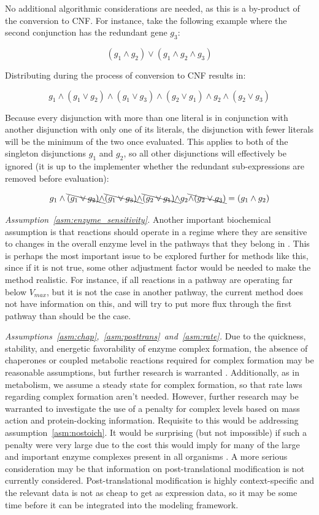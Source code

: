 No additional algorithmic considerations are needed, as this is a
by-product of the conversion to CNF. For instance, take the following
example where the second conjunction has the redundant gene $g_3$: 

\[(g_1 \land g_2) \lor (g_1 \land g_2 \land g_3)\]

Distributing during the process of conversion to CNF results in:

\[
g_1 \land (g_1 \lor g_2 ) \land (g_1 \lor g_3) \land (g_2 \lor g_1) 
\land g_2 \land (g_2 \lor g_3)
\]

Because every disjunction with more than one literal is in conjunction
with another disjunction with only one of its literals, the
disjunction with fewer literals will be the minimum of the two once
evaluated. This applies to both of the singleton disjunctions $g_1$
and $g_2$, so all other disjunctions will effectively be ignored (it
is up to the implementer whether the redundant sub-expressions are
removed before evaluation):

\[
g_1 \land \bcancel{(g_1 \lor g_2 ) \land} \bcancel{(g_1 \lor g_3) \land} 
\bcancel{(g_2 \lor g_1) \land} g_2 \bcancel{\land (g_2 \lor g_3)} 
= (g_1 \land g_2)
\]


\emph{Assumption~\ref{asm:enzyme_sensitivity}.}
Another important biochemical assumption is that reactions should
operate in a regime where they are sensitive to changes in the overall
enzyme level in the pathways that they belong in
\citep{Bennett2009,Chubukov2013}. This is perhaps the most important
issue to be explored further for methods like this, since if it is not
true, some other adjustment factor would be needed to make the method
realistic. For instance, if all reactions in a pathway are operating
far below $V_{max}$, but it is not the case in another pathway, the
current method does not have information on this, and will try to put
more flux through the first pathway than should be the case.

\emph{Assumptions~\ref{asm:chap},~\ref{asm:posttrans}~and~\ref{asm:rate}.}
Due to the quickness, stability, and energetic favorability of enzyme
complex formation, the absence of chaperones or coupled metabolic
reactions required for complex formation may be reasonable
assumptions, but further research is warranted \citep{Karr2012}.
Additionally, as in metabolism, we assume a steady state for complex
formation, so that rate laws regarding complex formation aren't
needed. However, further research may be warranted to investigate the
use of a penalty for complex levels based on mass action and
protein-docking information. Requisite to this would be addressing
assumption~\ref{asm:nostoich}. It would be surprising (but not
impossible) if such a penalty were very large due to the cost this
would imply for many of the large and important enzyme complexes
present in all organisms \citep{Nelson2008}. A more serious
consideration may be that information on post-translational
modification is not currently considered. Post-translational
modification is highly context-specific and the relevant data is not
as cheap to get as expression data, so it may be some time before it
can be integrated into the modeling framework.

